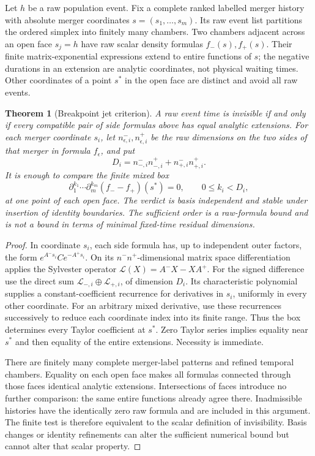 \documentclass[11pt]{article}
\newtheorem{theorem}{Theorem}[section]
\begin{document}
Let $h$ be a raw population event.  Fix a complete ranked labelled merger history with absolute merger coordinates $s=(s_1,\ldots,s_m)$.  Its raw event list partitions the ordered simplex into finitely many chambers.  Two chambers adjacent across an open face $s_j=h$ have raw scalar density formulas $f_-(s),f_+(s)$.  Their finite matrix-exponential expressions extend to entire functions of $s$; the negative durations in an extension are analytic coordinates, not physical waiting times.  Other coordinates of a point $s^*$ in the open face are distinct and avoid all raw events.

\begin{theorem}[Breakpoint jet criterion]
\label{thm:jet}
A raw event time is invisible if and only if every compatible pair of side formulas above has equal analytic extensions.  For each merger coordinate $s_i$, let $n_{\epsilon,i}^-,n_{\epsilon,i}^+$ be the raw dimensions on the two sides of that merger in formula $f_\epsilon$, and put
\[
D_i=n_{-,i}^-n_{-,i}^++n_{+,i}^-n_{+,i}^+.
\]
It is enough to compare the finite mixed box
\[
\partial_1^{k_1}\cdots\partial_m^{k_m}(f_--f_+)(s^*)=0,
\qquad 0\le k_i<D_i,
\]
at one point of each open face.  The verdict is basis independent and stable under insertion of identity boundaries.  The sufficient order is a raw-formula bound and is not a bound in terms of minimal fixed-time residual dimensions.
\end{theorem}

\begin{proof}
In coordinate $s_i$, each side formula has, up to independent outer factors, the form $e^{A^-s_i}Ce^{-A^+s_i}$.  On its $n^-n^+$-dimensional matrix space differentiation applies the Sylvester operator $\mathcal L(X)=A^-X-XA^+$.  For the signed difference use the direct sum $\mathcal L_{-,i}\oplus\mathcal L_{+,i}$, of dimension $D_i$.  Its characteristic polynomial supplies a constant-coefficient recurrence for derivatives in $s_i$, uniformly in every other coordinate.  For an arbitrary mixed derivative, use these recurrences successively to reduce each coordinate index into its finite range.  Thus the box determines every Taylor coefficient at $s^*$.  Zero Taylor series implies equality near $s^*$ and then equality of the entire extensions.  Necessity is immediate.

There are finitely many complete merger-label patterns and refined temporal chambers.  Equality on each open face makes all formulas connected through those faces identical analytic extensions.  Intersections of faces introduce no further comparison: the same entire functions already agree there.  Inadmissible histories have the identically zero raw formula and are included in this argument.  The finite test is therefore equivalent to the scalar definition of invisibility.  Basis changes or identity refinements can alter the sufficient numerical bound but cannot alter that scalar property.
\end{proof}
\end{document}
